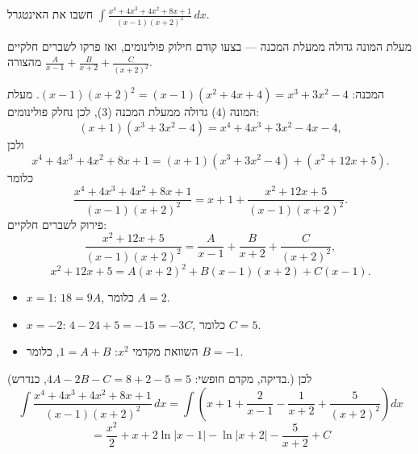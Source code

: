 
\begin{question}
חשבו את האינטגרל $\displaystyle\int\frac{x^4+4x^3+4x^2+8x+1}{(x-1)(x+2)^2}\,dx$.
\end{question}

\begin{hint}
מעלת המונה גדולה ממעלת המכנה — בצעו קודם חילוק פולינומים, ואז פרקו לשברים חלקיים מהצורה $\frac{A}{x-1}+\frac{B}{x+2}+\frac{C}{(x+2)^2}$.
\end{hint}

\begin{solution}
המכנה: $(x-1)(x+2)^2=(x-1)(x^2+4x+4)=x^3+3x^2-4$. מעלת המונה ($4$) גדולה ממעלת המכנה ($3$), לכן נחלק פולינומים:
\[ (x+1)(x^3+3x^2-4)=x^4+4x^3+3x^2-4x-4, \]
ולכן
\[ x^4+4x^3+4x^2+8x+1=(x+1)(x^3+3x^2-4)+(x^2+12x+5). \]
כלומר
\[ \frac{x^4+4x^3+4x^2+8x+1}{(x-1)(x+2)^2}=x+1+\frac{x^2+12x+5}{(x-1)(x+2)^2}. \]
פירוק לשברים חלקיים:
\[ \frac{x^2+12x+5}{(x-1)(x+2)^2}=\frac{A}{x-1}+\frac{B}{x+2}+\frac{C}{(x+2)^2}, \]
\[ x^2+12x+5=A(x+2)^2+B(x-1)(x+2)+C(x-1). \]
\begin{itemize}
  \item $x=1$: $18=9A$, כלומר $A=2$.
  \item $x=-2$: $4-24+5=-15=-3C$, כלומר $C=5$.
  \item השוואת מקדמי $x^2$: $1=A+B$, כלומר $B=-1$.
\end{itemize}
(בדיקה, מקדם חופשי: $4A-2B-C=8+2-5=5$, כנדרש.) לכן
\[ \int\frac{x^4+4x^3+4x^2+8x+1}{(x-1)(x+2)^2}\,dx=\int\left(x+1+\frac{2}{x-1}-\frac{1}{x+2}+\frac{5}{(x+2)^2}\right)dx \]
\[ \boxed{=\frac{x^2}{2}+x+2\ln|x-1|-\ln|x+2|-\frac{5}{x+2}+C} \]
\end{solution}
